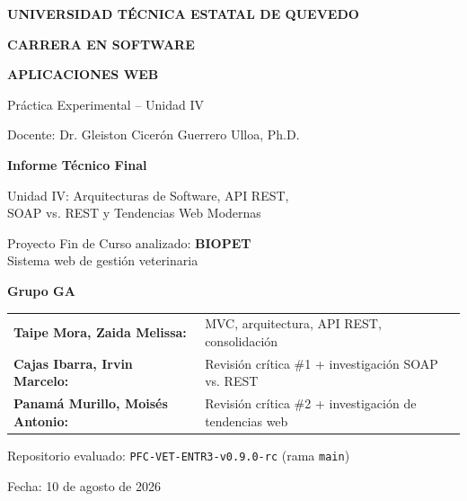 \documentclass[11pt,a4paper]{article}
\begin{document}
\begin{titlepage}
    \centering
    \vspace*{1.5cm}

    {\large\bfseries UNIVERSIDAD TÉCNICA ESTATAL DE QUEVEDO \par}
    {\large\bfseries CARRERA EN SOFTWARE \par}
    {\large\bfseries APLICACIONES WEB \par}
    \vspace{0.3cm}
    {\normalsize Práctica Experimental -- Unidad IV \par}
    \vspace{0.4cm}
    {\normalsize Docente: Dr. Gleiston Cicerón Guerrero Ulloa, Ph.D. \par}
    \vspace{1.8cm}

    {\Huge\bfseries Informe Técnico Final \par}
    \vspace{0.4cm}
    {\Large Unidad IV: Arquitecturas de Software, API REST, \\ SOAP vs. REST y Tendencias Web Modernas \par}
    \vspace{0.5cm}
    {\large Proyecto Fin de Curso analizado: \textbf{BIOPET} \\ Sistema web de gestión veterinaria \par}


    \vspace{2.5cm}
    {\large\bfseries Grupo GA \par}
    \vspace{0.3cm}
    \begin{tabular}{ll}
        \textbf{Taipe Mora, Zaida Melissa:} & MVC, arquitectura, API REST, consolidación \\
        \textbf{Cajas Ibarra, Irvin Marcelo:} & Revisión crítica \#1 + investigación SOAP vs. REST \\
        \textbf{Panamá Murillo, Moisés Antonio:} & Revisión crítica \#2 + investigación de tendencias web \\
    \end{tabular}

    \vspace{2.5cm}
    {\normalsize Repositorio evaluado: \texttt{PFC-VET-ENTR3-v0.9.0-rc} (rama \texttt{main}) \par}
    
    {\normalsize Fecha: 10 de agosto de 2026 \par}
    \vfill
\end{titlepage}
\end{document}
